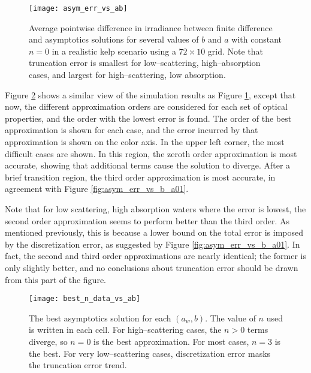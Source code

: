 \begin{figure}[H]
  \centering
  \texttt{[image: asym\_err\_vs\_ab]}
  \caption{Average pointwise difference in irradiance between finite difference and asymptotics solutions for several values of $b$ and $a$ with constant $n=0$ in a realistic kelp scenario using a $72\times 10$ grid. Note that truncation error is smallest for low--scattering, high--absorption cases, and largest for high--scattering, low absorption.}
  \label{fig:asym_err_vs_ab}
\end{figure}

Figure \ref{fig:best_n_data_vs_ab} shows a similar view of the simulation results as Figure \ref{fig:asym_err_vs_ab}, except that now, the different approximation orders are considered for each set of optical properties, and the order with the lowest error is found.
The order of the best approximation is shown for each case, and the error incurred by that approximation is shown on the color axis.
In the upper left corner, the most difficult cases are shown.
In this region, the zeroth order approximation is most accurate, showing that additional terms cause the solution to diverge.
After a brief transition region, the third order approximation is most accurate, in agreement with Figure \ref{fig:asym_err_vs_b_a01}.

Note that for low scattering, high absorption waters where the error is lowest, the second order approximation seems to perform better than the third order.
As mentioned previously, this is because a lower bound on the total error is imposed by the discretization error, as suggested by Figure \ref{fig:asym_err_vs_b_a01}.
In fact, the second and third order approximations are nearly identical; the former is only slightly better, and no conclusions about truncation error should be drawn from this part of the figure.

\begin{figure}[H]
  \centering
  \texttt{[image: best\_n\_data\_vs\_ab]}
  \caption{The best asymptotics solution for each $(a_w,b)$. The value of $n$ used is written in each cell. For high--scattering cases, the $n>0$ terms diverge, so $n=0$ is the best approximation. For most cases, $n=3$ is the best. For very low--scattering cases, discretization error masks the truncation error trend.}
  \label{fig:best_n_data_vs_ab}
\end{figure}

